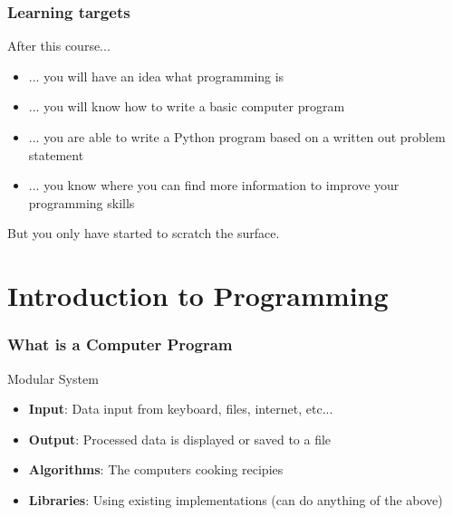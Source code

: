 \documentclass[10pt, a4paper]{beamer} %
\begin{document}

\begin{frame}[c]\frametitle{Learning targets}

	After this course...
	\begin{itemize}
		\item ... you will have an idea what programming is
		\item ... you will know how to write a basic computer program
		\item ... you are able to write a Python program based on a written out
		      problem statement
		\item ... you know where you can find more information to improve your
		      programming skills
	\end{itemize}

	But you only have started to scratch the surface.
\end{frame}


\section{Introduction to Programming} %
\label{sec:introduction_to_programming}

\begin{frame}[c]\frametitle{What is a Computer Program}
	\begin{block}{Modular System}
		\begin{itemize}
			\item \textbf{Input}: Data input from keyboard, files, internet, etc...
			\item \textbf{Output}: Processed data is displayed or saved to a file
			\item \textbf{Algorithms}: The computers cooking recipies
			\item \textbf{Libraries}: Using existing implementations (can do anything of the above)
		\end{itemize}

	\end{block}
\end{frame}
\end{document}
